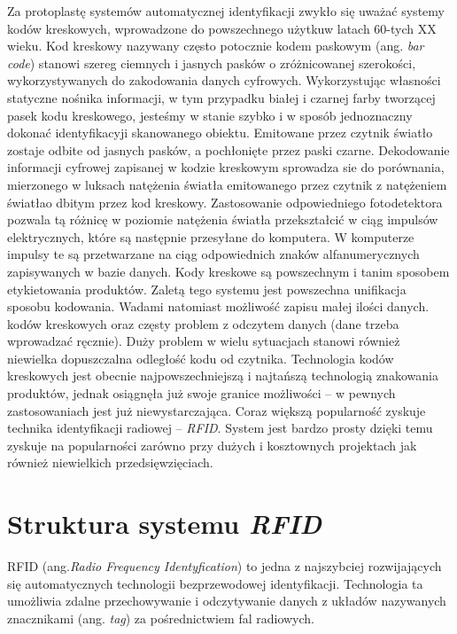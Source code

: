 Za protoplastę systemów automatycznej identyfikacji zwykło się uważać systemy kodów kreskowych, wprowadzone do powszechnego użytkuw latach 60-tych XX wieku.
Kod kreskowy nazywany często potocznie kodem paskowym (ang. \emph{bar code}) stanowi szereg ciemnych i jasnych pasków o zróżnicowanej szerokości, wykorzystywanych do zakodowania danych cyfrowych. Wykorzystując własności statyczne nośnika informacji, w tym przypadku białej i czarnej farby tworzącej pasek kodu kreskowego, jesteśmy w stanie szybko i w sposób jednoznaczny dokonać identyfikacyji skanowanego obiektu. Emitowane przez czytnik światło zostaje odbite od jasnych pasków, a pochłonięte przez paski czarne. Dekodowanie informacji cyfrowej zapisanej w kodzie kreskowym sprowadza sie do porównania, mierzonego w luksach natężenia światła emitowanego przez czytnik z natężeniem światłao dbitym przez kod kreskowy. Zastosowanie odpowiedniego fotodetektora pozwala tą różnicę w poziomie natężenia światła przekształcić w ciąg impulsów elektrycznych, które są następnie przesyłane do komputera. W komputerze impulsy te są przetwarzane na ciąg odpowiednich znaków alfanumerycznych zapisywanych w bazie danych. 
Kody kreskowe są powszechnym i tanim sposobem etykietowania produktów. Zaletą tego systemu jest powszechna unifikacja sposobu kodowania. Wadami  natomiast możliwość zapisu małej ilości danych. kodów kreskowych oraz częsty problem z odczytem danych (dane trzeba wprowadzać ręcznie). Duży problem w wielu sytuacjach stanowi również niewielka dopuszczalna odległość kodu od czytnika. 
Technologia kodów kreskowych jest obecnie najpowszechniejszą i najtańszą technologią znakowania produktów, jednak osiągnęła już swoje granice możliwości – w pewnych zastosowaniach jest już niewystarczająca.
Coraz większą popularność zyskuje technika identyfikacji radiowej – \emph{RFID}. System jest bardzo prosty dzięki temu zyskuje na popularności zarówno przy dużych i kosztownych projektach jak również  niewielkich przedsięwzięciach.

\newpage

\section{Struktura systemu \emph{RFID}}

RFID (ang.\emph {Radio Frequency  Identyfication}) to jedna z najszybciej rozwijających  się automatycznych technologii bezprzewodowej  identyfikacji. Technologia ta umożliwia zdalne przechowywanie i odczytywanie danych z układów nazywanych znacznikami (ang. \emph{tag}) za pośrednictwiem fal radiowych. 

